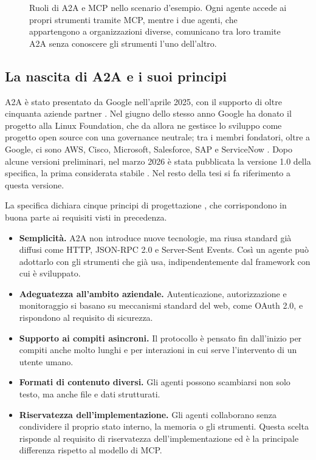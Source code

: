 \begin{figure}[htbp]
    \caption{Ruoli di A2A e MCP nello scenario d'esempio. Ogni agente accede ai propri strumenti tramite MCP, mentre i due agenti, che appartengono a organizzazioni diverse, comunicano tra loro tramite A2A senza conoscere gli strumenti l'uno dell'altro.}
    \label{fig:a2a-mcp}
\end{figure}

\subsection{La nascita di A2A e i suoi principi}

A2A è stato presentato da Google nell'aprile 2025, con il supporto di oltre cinquanta aziende partner \cite{google2025a2a}. Nel giugno dello 
stesso anno Google ha donato il progetto alla Linux Foundation, che da allora ne gestisce lo sviluppo come progetto open source con una governance neutrale;
 tra i membri fondatori, oltre a Google, ci sono AWS, Cisco, Microsoft, Salesforce, SAP e ServiceNow \cite{linuxfoundation2025a2a}. Dopo alcune versioni preliminari,
  nel marzo 2026 è stata pubblicata la versione 1.0 della specifica, la prima considerata stabile \cite{a2aspec}. Nel resto della tesi si fa riferimento a questa versione.


La specifica dichiara cinque principi di progettazione \cite{a2aspec}, che corrispondono in buona parte ai requisiti visti in precedenza.

\begin{itemize}
    \item \textbf{Semplicità.} A2A non introduce nuove tecnologie, ma riusa standard già diffusi come HTTP, JSON-RPC 2.0 e Server-Sent Events. Così un agente può adottarlo con gli strumenti che già usa, indipendentemente dal framework con cui è sviluppato.
    \item \textbf{Adeguatezza all'ambito aziendale.} Autenticazione, autorizzazione e monitoraggio si basano su meccanismi standard del web, come OAuth 2.0, e rispondono al requisito di sicurezza.
    \item \textbf{Supporto ai compiti asincroni.} Il protocollo è pensato fin dall'inizio per compiti anche molto lunghi e per interazioni in cui serve l'intervento di un utente umano.
    \item \textbf{Formati di contenuto diversi.} Gli agenti possono scambiarsi non solo testo, ma anche file e dati strutturati.
    \item \textbf{Riservatezza dell'implementazione.} Gli agenti collaborano senza condividere il proprio stato interno, la memoria o gli strumenti. Questa scelta risponde al requisito di riservatezza dell'implementazione ed è la principale differenza rispetto al modello di MCP.
\end{itemize}

